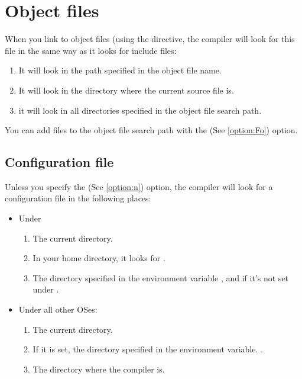 \documentclass{report}
\newcommand{\seeo}[1]{See \ref{option:#1}}
\begin{document}
\section{Object files}
When you link to object files (using the  directive,
the compiler will look for this file in the same way as it looks for include
files:

\begin{enumerate}
\item It will look in the path specified in the object file name. 
\item It will look in the directory where the current source file is.
\item it will look in all directories specified in the object file search path.
\end{enumerate}
You can add files to the object file search path with the  (\seeo{Fo})
option.

\subsection{Configuration file}
Unless you specify the  (\seeo{n}) option, the compiler will look 
for a configuration file  in the following places:

\begin{itemize} 
\item Under \linux
\begin{enumerate}
\item The current directory.
\item In your home directory, it looks for .
\item The directory specified in the environment variable 
, and if it's not set under .
\end{enumerate}
\item Under all other OSes:
\begin{enumerate}
\item The current directory.
\item If it is set, the directory specified in the environment variable.
.
\item The directory where the compiler is. 
\end{enumerate}
\end{itemize}


\end{document}
